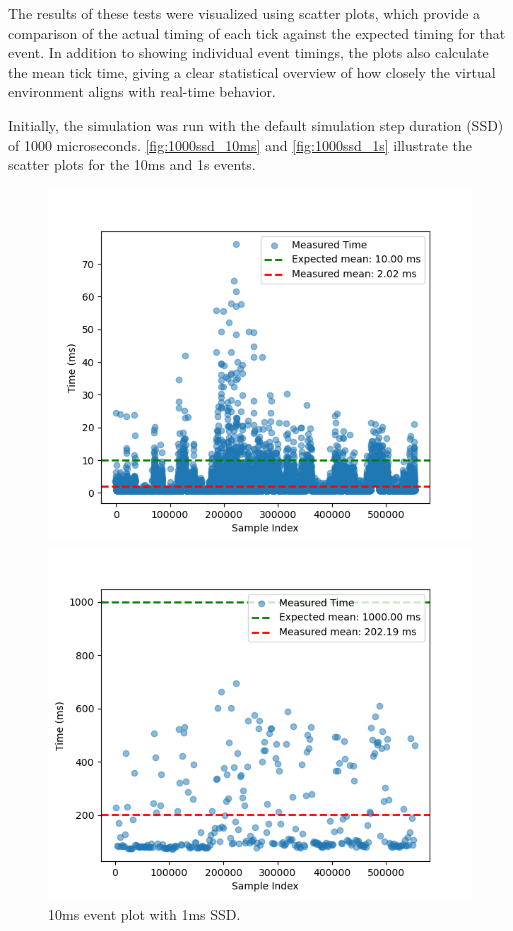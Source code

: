 The results of these tests were visualized using scatter plots, which provide a comparison of the actual timing of each tick against the expected timing for that event. In addition to showing individual event timings, the plots also calculate the mean tick time, giving a clear statistical overview of how closely the virtual environment aligns with real-time behavior. 

Initially, the simulation was run with the default simulation step duration (SSD) of 1000 microseconds. \autoref{fig:1000ssd_10ms} and \autoref{fig:1000ssd_1s} illustrate the scatter plots for the 10ms and 1s events.

\newpage

\begin{figure}[h]
  \centering
  \begin{minipage}{0.49\textwidth}
    \centering
    \includegraphics[width=1\linewidth]{figures/scatter_1000ssd_10ms.png}
    \caption{10ms event plot with 1ms SSD.} 
    \label{fig:1000ssd_10ms}
  \end{minipage}
  \hfill
  \begin{minipage}{0.5\textwidth}
    \centering
    \includegraphics[width=1\linewidth]{figures/scatter_1000ssd_1s.png}

\end{minipage}
\end{figure}
